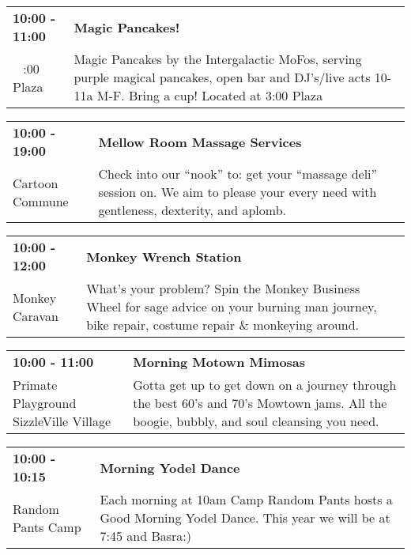 \begin{tabular}{ p{1in} p{2.2in} }
    \textbf{10:00 - 11:00} & \textbf{Magic Pancakes!} \\
    ~ \newline 3:00 Plaza & Magic Pancakes by the Intergalactic MoFos, serving purple magical pancakes, open bar and DJ's/live acts 10-11a M-F. Bring a cup! Located at 3:00 Plaza \\
    \hline 
\end{tabular}
    
\begin{tabular}{ p{1in} p{2.2in} }
    \textbf{10:00 - 19:00} & \textbf{Mellow Room Massage Services} \\
    Cartoon Commune \newline  & Check into our ``nook'' to: get your ``massage deli'' session on. We aim to please your every need with gentleness, dexterity, and aplomb. \\
    \hline 
\end{tabular}
    
\begin{tabular}{ p{1in} p{2.2in} }
    \textbf{10:00 - 12:00} & \textbf{Monkey Wrench Station} \\
    Monkey Caravan \newline  & What's your problem? Spin the Monkey Business Wheel for sage advice on your burning man journey, bike repair, costume repair \& monkeying around. \\
    \hline 
\end{tabular}
    
\begin{tabular}{ p{1in} p{2.2in} }
    \textbf{10:00 - 11:00} & \textbf{Morning Motown Mimosas} \\
    Primate Playground \newline SizzleVille Village & Gotta get up to get down on a journey through the best 60's and 70's Mowtown jams. All the boogie, bubbly, and soul cleansing you need. \\
    \hline 
\end{tabular}
    
\begin{tabular}{ p{1in} p{2.2in} }
    \textbf{10:00 - 10:15} & \textbf{Morning Yodel Dance} \\
    Random Pants Camp \newline  & Each morning at 10am Camp Random Pants hosts a Good Morning Yodel Dance. This year we will be at 7:45 and Basra:) \\
    \hline 
\end{tabular}
    
